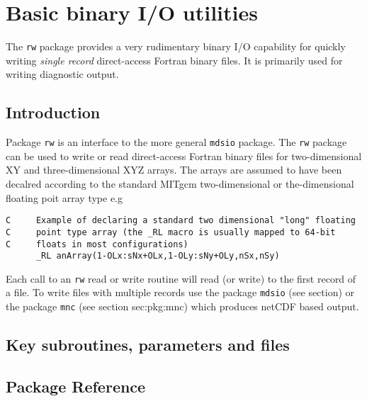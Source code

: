 \section{Basic binary I/O utilities}
\label{sec:pkg:rw}
The {\tt rw} package provides a very rudimentary binary I/O capability
for quickly writing {\it single record} direct-access Fortran binary files. 
It is primarily used for writing diagnostic output.

\subsection{Introduction}
Package {\tt rw} is an interface to the more general {\tt mdsio} package.
The {\tt rw} package can be used to write or read direct-access Fortran 
binary files for two-dimensional XY and three-dimensional XYZ arrays. 
The arrays are assumed to have been decalred according to the standard
MITgcm two-dimensional or the-dimensional floating poit array type e.g
\begin{verbatim}
C     Example of declaring a standard two dimensional "long" floating
C     point type array (the _RL macro is usually mapped to 64-bit 
C     floats in most configurations)
      _RL anArray(1-OLx:sNx+OLx,1-OLy:sNy+OLy,nSx,nSy)
\end{verbatim}
Each call to an {\tt rw} read or write routine will read (or write) to the 
first record of a file. To write files with multiple records use the 
package {\tt mdsio} (see section) or the package {\tt mnc} (see section {sec:pkg:mnc}) 
which produces netCDF \cite{rew:97} based output.

\subsection{Key subroutines, parameters and files}
\label{sec:pkg:rw:implementation_synopsis}
\subsection{Package Reference}
